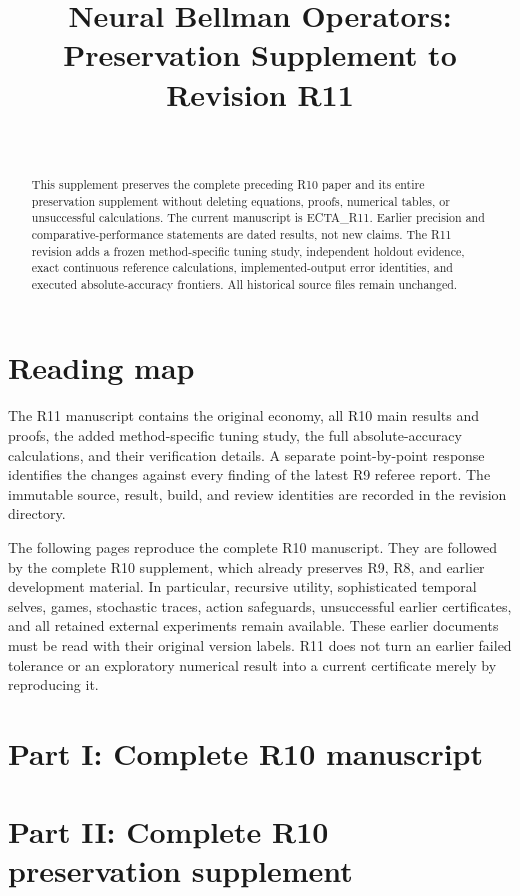 \documentclass[ecta]{econsocart}
\begin{document}
\begin{frontmatter}
\title{Neural Bellman Operators: Preservation Supplement to Revision R11}
\begin{aug}
\author[id=au1,addressref={add1}]{~}
\address[id=add1]{}
\end{aug}
\begin{abstract}
This supplement preserves the complete preceding R10 paper and its entire preservation supplement without deleting equations, proofs, numerical tables, or unsuccessful calculations. The current manuscript is ECTA\_R11. Earlier precision and comparative-performance statements are dated results, not new claims. The R11 revision adds a frozen method-specific tuning study, independent holdout evidence, exact continuous reference calculations, implemented-output error identities, and executed absolute-accuracy frontiers. All historical source files remain unchanged.
\end{abstract}
\end{frontmatter}
\section*{Reading map}
The R11 manuscript contains the original economy, all R10 main results and proofs, the added method-specific tuning study, the full absolute-accuracy calculations, and their verification details. A separate point-by-point response identifies the changes against every finding of the latest R9 referee report. The immutable source, result, build, and review identities are recorded in the revision directory.

The following pages reproduce the complete R10 manuscript. They are followed by the complete R10 supplement, which already preserves R9, R8, and earlier development material. In particular, recursive utility, sophisticated temporal selves, games, stochastic traces, action safeguards, unsuccessful earlier certificates, and all retained external experiments remain available. These earlier documents must be read with their original version labels. R11 does not turn an earlier failed tolerance or an exploratory numerical result into a current certificate merely by reproducing it.

\section*{Part I: Complete R10 manuscript}

\section*{Part II: Complete R10 preservation supplement}

\end{document}
